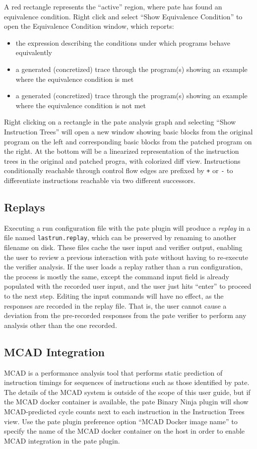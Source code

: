 A red rectangle represents the ``active'' region, where pate has found an equivalence condition.
Right click and select ``Show Equivalence Condition'' to open the Equivalence Condition window, which reports:

\begin{itemize}
    \item the expression describing the conditions under which programs behave equivalently
    \item a generated (concretized) trace through the program(s) showing an example where the equivalence condition is met
    \item a generated (concretized) trace through the program(s) showing an example where the equivalence condition is not met
\end{itemize}

Right clicking on a rectangle in the pate analysis graph and selecting ``Show Instruction Trees'' will open a new window showing basic blocks from the original program on the left and corresponding basic blocks from the patched program on the right.
At the bottom will be a linearized representation of the instruction trees in the original and patched progra, with colorized diff view.
Instructions conditionally reachable through control flow edges are prefixed by \texttt{+} or \texttt{-} to differentiate instructions reachable via two different successors.

\subsection{Replays}

Executing a run configuration file with the pate plugin will produce a \emph{replay} in a file named \texttt{lastrun.replay}, which can be preserved by renaming to another filename on disk.
These files cache the user input and verifier output, enabling the user to review a previous interaction with pate without having to re-execute the verifier analysis.
If the user loads a replay rather than a run configuration, the process is mostly the same, except the command input field is already populated with the recorded user input, and the user just hits ``enter'' to proceed to the next step.
Editing the input commands will have no effect, as the responses are recorded in the replay file.
That is, the user cannot cause a deviation from the pre-recorded responses from the pate verifier to perform any analysis other than the one recorded.

\subsection{MCAD Integration}

MCAD is a performance analysis tool that performs static prediction of instruction timings for sequences of instructions such as those identified by pate.
The details of the MCAD system is outside of the scope of this user guide, but if the MCAD docker container is available, the pate Binary Ninja plugin will show MCAD-predicted cycle counts next to each instruction in the Instruction Trees view.
Use the pate plugin preference option ``MCAD Docker image name'' to specify the name of the MCAD docker container on the host in order to enable MCAD integration in the pate plugin.
